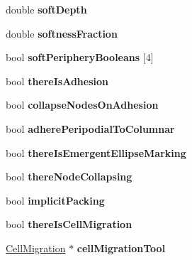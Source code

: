 \begin{DoxyCompactItemize}
\item 
\hypertarget{classSimulation_ab8301fb9927cb0527b8f58129aca5626}{}double {\bfseries soft\+Depth}\label{classSimulation_ab8301fb9927cb0527b8f58129aca5626}

\item 
\hypertarget{classSimulation_a13ef7df1104c1e1263f50f11f36f3cdf}{}double {\bfseries softness\+Fraction}\label{classSimulation_a13ef7df1104c1e1263f50f11f36f3cdf}

\item 
\hypertarget{classSimulation_a939ae561258603220a73e00ad4143def}{}bool {\bfseries soft\+Periphery\+Booleans} \mbox{[}4\mbox{]}\label{classSimulation_a939ae561258603220a73e00ad4143def}

\item 
\hypertarget{classSimulation_a193d6b133b6b3cc3ad199dde1420756d}{}bool {\bfseries there\+Is\+Adhesion}\label{classSimulation_a193d6b133b6b3cc3ad199dde1420756d}

\item 
\hypertarget{classSimulation_a6ee4b25647be698c89219c1cca3ba15e}{}bool {\bfseries collapse\+Nodes\+On\+Adhesion}\label{classSimulation_a6ee4b25647be698c89219c1cca3ba15e}

\item 
\hypertarget{classSimulation_ac6a881ae3af11398a4fcab32901110b7}{}bool {\bfseries adhere\+Peripodial\+To\+Columnar}\label{classSimulation_ac6a881ae3af11398a4fcab32901110b7}

\item 
\hypertarget{classSimulation_a6f134ccf6b32a0c6daefc77b298bd0f3}{}bool {\bfseries there\+Is\+Emergent\+Ellipse\+Marking}\label{classSimulation_a6f134ccf6b32a0c6daefc77b298bd0f3}

\item 
\hypertarget{classSimulation_ab123970654b2c9352dca1fb046cc2173}{}bool {\bfseries there\+Node\+Collapsing}\label{classSimulation_ab123970654b2c9352dca1fb046cc2173}

\item 
\hypertarget{classSimulation_ae940044346e35e17acd9f4c419f9ce4a}{}bool {\bfseries implicit\+Packing}\label{classSimulation_ae940044346e35e17acd9f4c419f9ce4a}

\item 
\hypertarget{classSimulation_adc39602e1dc520c11d40f58a5fe31149}{}bool {\bfseries there\+Is\+Cell\+Migration}\label{classSimulation_adc39602e1dc520c11d40f58a5fe31149}

\item 
\hypertarget{classSimulation_a5db9e2abdc19e0190a9450178a88ae89}{}\hyperlink{classCellMigration}{Cell\+Migration} $\ast$ {\bfseries cell\+Migration\+Tool}\label{classSimulation_a5db9e2abdc19e0190a9450178a88ae89}


\end{DoxyCompactItemize}
